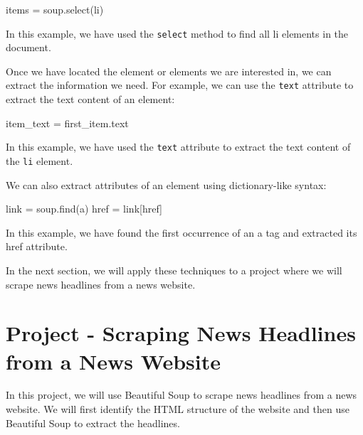 \documentclass[
  paper=a4,
  ,captions=tableheading
]{scrartcl}
\newenvironment{Shaded}{}{}
\newcommand{\NormalTok}[1]{#1}
\newcommand{\OperatorTok}[1]{\textcolor[rgb]{0.40,0.40,0.40}{#1}}
\newcommand{\StringTok}[1]{\textcolor[rgb]{0.25,0.44,0.63}{#1}}
\begin{document}
\begin{Shaded}
\begin{Highlighting}[]
\NormalTok{items }\OperatorTok{=}\NormalTok{ soup.select(}\StringTok{\textquotesingle{}li\textquotesingle{}}\NormalTok{)}
\end{Highlighting}
\end{Shaded}

In this example, we have used the \texttt{select} method to find all li
elements in the document.

Once we have located the element or elements we are interested in, we
can extract the information we need. For example, we can use the
\texttt{text} attribute to extract the text content of an element:

\begin{Shaded}
\begin{Highlighting}[]
\NormalTok{item\_text }\OperatorTok{=}\NormalTok{ first\_item.text}
\end{Highlighting}
\end{Shaded}

In this example, we have used the \texttt{text} attribute to extract the
text content of the \texttt{li} element.

We can also extract attributes of an element using dictionary-like
syntax:

\begin{Shaded}
\begin{Highlighting}[]
\NormalTok{link }\OperatorTok{=}\NormalTok{ soup.find(}\StringTok{\textquotesingle{}a\textquotesingle{}}\NormalTok{)}
\NormalTok{href }\OperatorTok{=}\NormalTok{ link[}\StringTok{\textquotesingle{}href\textquotesingle{}}\NormalTok{]}
\end{Highlighting}
\end{Shaded}

In this example, we have found the first occurrence of an a tag and
extracted its href attribute.

In the next section, we will apply these techniques to a project where
we will scrape news headlines from a news website.

\hypertarget{project---scraping-news-headlines-from-a-news-website}{%
\section{Project - Scraping News Headlines from a News
Website}\label{project---scraping-news-headlines-from-a-news-website}}

In this project, we will use Beautiful Soup to scrape news headlines
from a news website. We will first identify the HTML structure of the
website and then use Beautiful Soup to extract the headlines.
\end{document}
